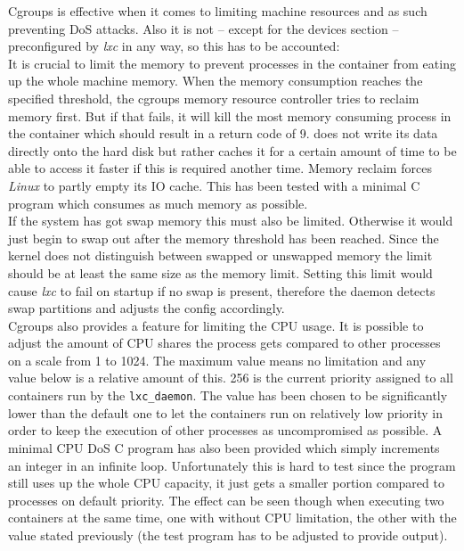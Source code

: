 Cgroups is effective when it comes to limiting machine resources and as such preventing DoS attacks.
Also it is not -- except for the devices section -- preconfigured by \textit{lxc} in any way, so this has to be accounted:\\
It is crucial to limit the memory to prevent processes in the container from eating up the whole machine memory.
When the memory consumption reaches the specified threshold, the cgroups memory resource controller tries to reclaim memory first.
But if that fails, it will kill the most memory consuming process in the container which should result in a return code of 9\cite{cgrpmem}.
 does not write its data directly onto the hard disk but rather caches it for a certain amount of time to be able to
access it faster if this is required another time. Memory reclaim forces \textit{Linux} to partly empty its IO cache.
This has been tested with a minimal C program which consumes as much memory as possible.\\
If the system has got swap memory this must also be limited. Otherwise it would just begin to swap out after the memory
threshold has been reached. Since the kernel does not distinguish between swapped or unswapped memory the limit should
be at least the same size as the memory limit.
Setting this limit would cause \textit{lxc} to fail on startup if no swap is present, therefore the daemon detects swap
partitions and adjusts the config accordingly.\\
Cgroups also provides a feature for limiting the CPU usage. It is possible to adjust the amount of CPU shares the process gets compared to
other processes on a scale from 1 to 1024. The maximum value means no limitation and any value below is a relative amount of this.
256 is the current priority assigned to all containers run by the \texttt{lxc\_daemon}. The value has been chosen to be significantly lower
than the default one to let the containers run on relatively low priority in order to keep the execution of other processes as uncompromised as possible.
A minimal CPU DoS C program has also been provided which simply increments an integer in an infinite loop. Unfortunately this is hard to test
since the program still uses up the whole CPU capacity, it just gets a smaller portion compared to processes on default priority.
The effect can be seen though when executing two containers at the same time, one with without CPU limitation, the other with the value
stated previously (the test program has to be adjusted to provide output).\\
